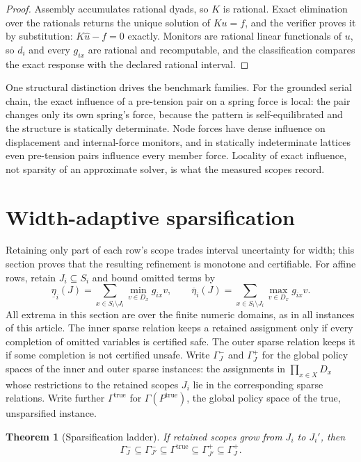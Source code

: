 \documentclass[11pt]{article}
\theoremstyle{plain}
\newtheorem{theorem}{Theorem}[section]
\theoremstyle{definition}
\theoremstyle{remark}
\begin{document}
\begin{proof}
Assembly accumulates rational dyads, so \(K\) is rational.  Exact
elimination over the rationals returns the unique solution of \(Ku=f\), and
the verifier proves it by substitution: \(K\widehat u-f=0\) exactly.
Monitors are rational linear functionals of \(u\), so \(d_i\) and every
\(g_{ix}\) are rational and recomputable, and the classification compares
the exact response with the declared rational interval.
\end{proof}

One structural distinction drives the benchmark families.  For the grounded
serial chain, the exact influence of a pre-tension pair on a spring force is
local: the pair changes only its own spring's force, because the pattern is
self-equilibrated and the structure is statically determinate.  Node forces
have dense influence on displacement and internal-force monitors, and in
statically indeterminate lattices even pre-tension pairs influence every
member force.  Locality of exact influence, not sparsity of an approximate
solver, is what the measured scopes record.

\section{Width-adaptive sparsification}
\label{sec:sparsification}

Retaining only part of each row's scope trades interval uncertainty for
width; this section proves that the resulting refinement is monotone and
certifiable.  For affine rows, retain \(J_i\subseteq S_i\) and bound omitted terms by
\[
\underline\eta_i(J)=
\sum_{x\in S_i\setminus J_i}\min_{v\in D_x}g_{ix}v,
\qquad
\overline\eta_i(J)=
\sum_{x\in S_i\setminus J_i}\max_{v\in D_x}g_{ix}v.
\]
All extrema in this section are over the finite numeric domains, as in all
instances of this article.
The inner sparse relation keeps a retained assignment only if every completion
of omitted variables is certified safe.  The outer sparse relation keeps it if
some completion is not certified unsafe.  Write \(\Gamma^-_J\) and
\(\Gamma^+_J\) for the global policy spaces of the inner and outer sparse
instances: the assignments in \(\prod_{x\in X}D_x\) whose restrictions to
the retained scopes \(J_i\) lie in the corresponding sparse relations.  Write
further \(\Gamma^{\mathrm{true}}\) for \(\Gamma(P^{\mathrm{true}})\), the
global policy space of the true, unsparsified instance.

\begin{theorem}[Sparsification ladder]
If retained scopes grow from \(J_i\) to \(J_i'\), then
\[
  \Gamma^-_J
  \subseteq
  \Gamma^-_{J'}
  \subseteq
  \Gamma^{\mathrm{true}}
  \subseteq
  \Gamma^+_{J'}
  \subseteq
  \Gamma^+_J.
\]
\end{theorem}
\end{document}
